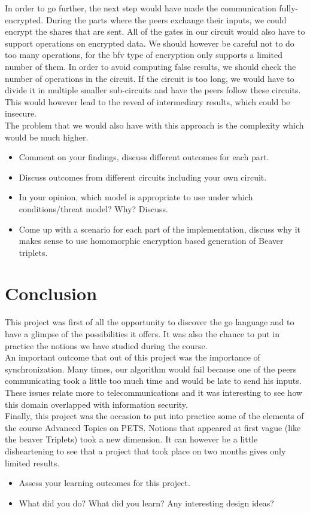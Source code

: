 \documentclass[10pt,conference,compsocconf]{IEEEtran}
\begin{document}
In order to go further, the next step would have made the communication fully-encrypted. During the parts where the peers exchange their inputs, we could encrypt the shares that are sent.
All of the gates in our circuit would also have to support operations on encrypted data.
We should however be careful not to do too many operations, for the bfv type of encryption only supports a limited number of them. In order to avoid computing false results, we should check the number of operations in the circuit. If the circuit is too long, we would have to divide it in multiple smaller sub-circuits and have the peers follow these circuits. This would however lead to the reveal of intermediary results, which could be insecure.\\
The problem that we would also have with this approach is the complexity which would be much higher.\\

\begin{itemize}
    \item Comment on your findings, discuss different outcomes for each part.
    \item Discuss outcomes from different circuits including your own circuit.
    \item In your opinion, which model is appropriate to use under which conditions/threat model? Why? Discuss.
    \item Come up with a scenario for each part of the implementation, discuss why it makes sense to use homomorphic encryption based generation of Beaver triplets.
\end{itemize}

\section{Conclusion}
This project was first of all the opportunity to discover the go language and to have a glimpse of the possibilities it offers. It was also the chance to put in practice the notions we have studied during the course.\\
An important outcome that out of this project was the importance of synchronization. Many times, our algorithm would fail because one of the peers communicating took a little too much time and would be late to send his inputs. These issues relate more to telecommunications and it was interesting to see how this domain overlapped with information security.\\
Finally, this project was the occasion to put into practice some of the elements of the course Advanced Topics on PETS. Notions that appeared at first vague (like the beaver Triplets) took a new dimension. It can however be a little disheartening to see that a project that took place on two months gives only limited results.\\
\begin{itemize}
    \item Assess your learning outcomes for this project.
    \item What did you do? What did you learn? Any interesting design ideas? 
\end{itemize}


{}
\end{document}
